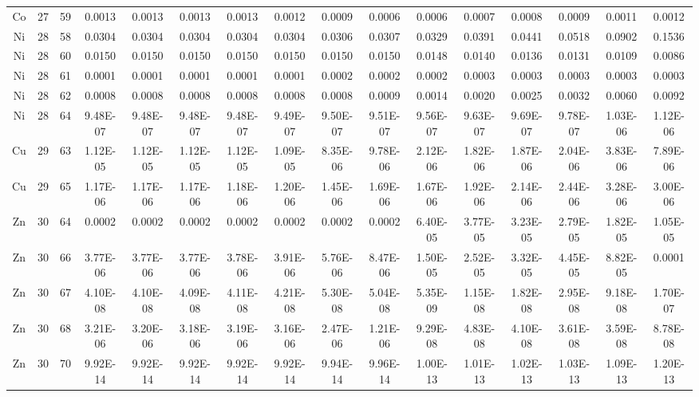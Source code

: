 {\begin{tabular}{|c|c|c|c|c|c|c|c|c|c|c|c|c|c|c|c|}
Co & 27 & 59   & 0.0013   & 0.0013   & 0.0013   & 0.0013   & 0.0012   & 0.0009   & 0.0006   & 0.0006   & 0.0007   & 0.0008   & 0.0009   & 0.0011   & 0.0012   \\
Ni & 28 & 58   & 0.0304   & 0.0304   & 0.0304   & 0.0304   & 0.0304   & 0.0306   & 0.0307   & 0.0329   & 0.0391   & 0.0441   & 0.0518   & 0.0902   & 0.1536   \\
Ni & 28 & 60   & 0.0150   & 0.0150   & 0.0150   & 0.0150   & 0.0150   & 0.0150   & 0.0150   & 0.0148   & 0.0140   & 0.0136   & 0.0131   & 0.0109   & 0.0086   \\
Ni & 28 & 61   & 0.0001   & 0.0001   & 0.0001   & 0.0001   & 0.0001   & 0.0002   & 0.0002   & 0.0002   & 0.0003   & 0.0003   & 0.0003   & 0.0003   & 0.0003   \\
Ni & 28 & 62   & 0.0008   & 0.0008   & 0.0008   & 0.0008   & 0.0008   & 0.0008   & 0.0009   & 0.0014   & 0.0020   & 0.0025   & 0.0032   & 0.0060   & 0.0092   \\
Ni & 28 & 64   & 9.48E-07 & 9.48E-07 & 9.48E-07 & 9.48E-07 & 9.49E-07 & 9.50E-07 & 9.51E-07 & 9.56E-07 & 9.63E-07 & 9.69E-07 & 9.78E-07 & 1.03E-06 & 1.12E-06 \\
Cu & 29 & 63   & 1.12E-05 & 1.12E-05 & 1.12E-05 & 1.12E-05 & 1.09E-05 & 8.35E-06 & 9.78E-06 & 2.12E-06 & 1.82E-06 & 1.87E-06 & 2.04E-06 & 3.83E-06 & 7.89E-06 \\
Cu & 29 & 65   & 1.17E-06 & 1.17E-06 & 1.17E-06 & 1.18E-06 & 1.20E-06 & 1.45E-06 & 1.69E-06 & 1.67E-06 & 1.92E-06 & 2.14E-06 & 2.44E-06 & 3.28E-06 & 3.00E-06 \\
Zn & 30 & 64   & 0.0002   & 0.0002   & 0.0002   & 0.0002   & 0.0002   & 0.0002   & 0.0002   & 6.40E-05 & 3.77E-05 & 3.23E-05 & 2.79E-05 & 1.82E-05 & 1.05E-05 \\
Zn & 30 & 66   & 3.77E-06 & 3.77E-06 & 3.77E-06 & 3.78E-06 & 3.91E-06 & 5.76E-06 & 8.47E-06 & 1.50E-05 & 2.52E-05 & 3.32E-05 & 4.45E-05 & 8.82E-05 & 0.0001   \\
Zn & 30 & 67   & 4.10E-08 & 4.10E-08 & 4.09E-08 & 4.11E-08 & 4.21E-08 & 5.30E-08 & 5.04E-08 & 5.35E-09 & 1.15E-08 & 1.82E-08 & 2.95E-08 & 9.18E-08 & 1.70E-07 \\
Zn & 30 & 68   & 3.21E-06 & 3.20E-06 & 3.18E-06 & 3.19E-06 & 3.16E-06 & 2.47E-06 & 1.21E-06 & 9.29E-08 & 4.83E-08 & 4.10E-08 & 3.61E-08 & 3.59E-08 & 8.78E-08 \\
Zn & 30 & 70   & 9.92E-14 & 9.92E-14 & 9.92E-14 & 9.92E-14 & 9.92E-14 & 9.94E-14 & 9.96E-14 & 1.00E-13 & 1.01E-13 & 1.02E-13 & 1.03E-13 & 1.09E-13 & 1.20E-13 \\

\end{tabular}}
